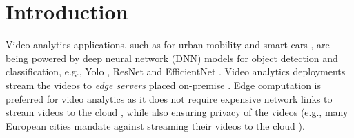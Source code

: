 
\section{Introduction}
\label{sec:ekya_intro}

Video analytics applications, such as for urban mobility   %
and smart cars \cite{bellevue-report}, are being powered by deep neural network (DNN) models %
for object detection and classification, e.g., Yolo \cite{yolo9000-1}, ResNet \cite{deepresidual-2} and EfficientNet \cite{efficientnet-3}. %
Video analytics deployments stream the videos to {\em edge servers} \cite{azure-ase, aws-outposts} placed on-premise \cite{ieee-computer, edgevideo-1, edgevideo-2, getmobile}. Edge computation is preferred for video analytics as it does not require expensive network links to stream videos to the cloud \cite{getmobile}, while also ensuring privacy of the videos (e.g., many European cities mandate against streaming their videos to the cloud \cite{sweden-data, azure-data}).

